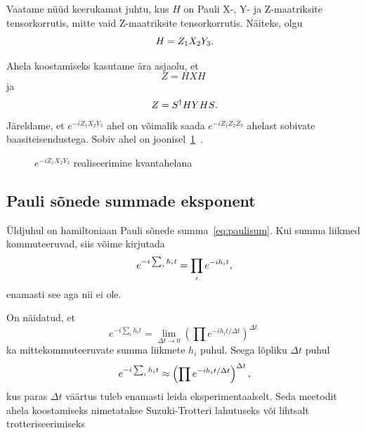 \documentclass[12pt]{article}
\def\paren#1{\left(#1\right)}
\begin{document}
Vaatame nüüd keerukamat juhtu, kus \(H\) on Pauli X-, Y- ja Z-maatriksite tensorkorrutis, mitte vaid Z-maatriksite tensorkorrutis.
Näiteks, olgu
\begin{equation}
  H=Z_1X_2Y_3\rlap{.}
\end{equation}

Ahela koostamiseks kasutame ära asjaolu, et
\begin{equation} Z=HXH \end{equation}
ja
\begin{equation} Z=S^{\dagger}HYHS\rlap{.} \end{equation}
Järeldame, et \(e^{-iZ_1X_2Y_3}\) ahel on võimalik saada \(e^{-iZ_1Z_2Z_3}\) ahelast sobivate baasiteisendustega.
Sobiv ahel on joonisel~\ref{f:zxyex}~\cite{nielsen+chuang}.

\begin{figure}[h]
  \centering
  \caption{\(e^{-iZ_1X_2Y_3}\) realiseerimine kvantahelana}
  \label{f:zxyex}
\end{figure}

\subsection{Pauli sõnede summade eksponent}

Üldjuhul on hamiltoniaan Pauli sõnede summa~\ref{eq:paulisum}.
Kui summa liikmed kommuteeruvad, siis võime kirjutada
\begin{equation}
  e^{-i\sum_i h_it}=\prod_ie^{-ih_it}\rlap{,}
\end{equation}
enamasti see aga nii ei ole.

On näidatud, et
\begin{equation}
  e^{-i\sum_i h_it}=\lim_{\Delta t\rightarrow0}\paren{\prod e^{-ih_i t/\Delta t}}^{\Delta t}
\end{equation}
ka mittekommuteeruvate summa liikmete $h_i$ puhul.
Seega lõpliku $\Delta t$ puhul
\begin{equation}
  e^{-i\sum_i h_it}\approx\paren{\prod e^{-ih_i t/\Delta t}}^{\Delta t}\rlap{,}
\end{equation}
kus paras $\Delta t$ väärtus tuleb enamasti leida eksperimentaalselt.
Seda meetodit ahela koostamiseks nimetatakse Suzuki-Trotteri lahutuseks või lihtsalt trotteriseerimiseks~\cite{mansky+etal}
\end{document}

